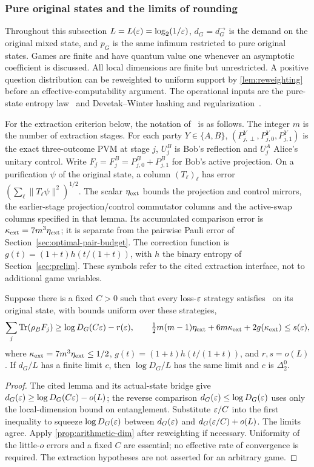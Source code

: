 \subsubsection{Pure original states and the limits of rounding}
Throughout this subsection $L=L(\varepsilon)=\log_2(1/\varepsilon)$, $d_G=d_G^\to$ is the demand on the original mixed state, and $p_G$ is the same infimum restricted to pure original states. Games are finite and have quantum value one whenever an asymptotic coefficient is discussed. All local dimensions are finite but unrestricted. A positive question distribution can be reweighted to uniform support by \cref{lem:reweighting} before an effective-computability argument. The operational inputs are the pure-state entropy law~\cite{BBPS96} and Devetak--Winter hashing and regularization~\cite[Theorems~10 and~13]{DW05}.

For the extraction criterion below, the notation of~\cite[Lemma~12.1]{DM-U3} is as follows. The integer $m$ is the number of extraction stages. For each party $Y\in\{A,B\}$, $(P^Y_{j,\perp},P^Y_{j,0},P^Y_{j,1})$ is the exact three-outcome PVM at stage $j$, $U_j^B$ is Bob's reflection and $U_j^A$ Alice's unitary control. Write $F_j=F_j^B=P^B_{j,0}+P^B_{j,1}$ for Bob's active projection. On a purification $\psi$ of the original state, a column $(T_\ell)_\ell$ has error $(\sum_\ell\|T_\ell\psi\|^2)^{1/2}$. The scalar $\eta_{\rm ext}$ bounds the projection and control mirrors, the earlier-stage projection/control commutator columns and the active-swap columns specified in that lemma. Its accumulated comparison error is $\kappa_{\rm ext}=7m^3\eta_{\rm ext}$; it is separate from the pairwise Pauli error of Section~\ref{sec:optimal-pair-budget}. The correction function is $g(t)=(1+t)h(t/(1+t))$, with $h$ the binary entropy of Section~\ref{sec:prelim}. These symbols refer to the cited extraction interface, not to additional game variables.

\begin{proposition}\label{prop:matched-coefficient}
Suppose there is a fixed $C>0$ such that every loss-$\varepsilon$ strategy satisfies~\cite[Lemma~12.1]{DM-U3} on its original state, with bounds uniform over these strategies,
\[
 \sum_j\operatorname{Tr}(\rho_BF_j)\ge\log D_G(C\varepsilon)-r(\varepsilon),\qquad
 \tfrac12m(m-1)\eta_{\rm ext}+6m\kappa_{\rm ext}+2g(\kappa_{\rm ext})\le s(\varepsilon),
\]
where $\kappa_{\rm ext}=7m^3\eta_{\rm ext}\le1/2$, $g(t)=(1+t)h(t/(1+t))$, and $r,s=o(L)$. If $d_G/L$ has a finite limit $c$, then $\log D_G/L$ has the same limit and $c$ is $\Delta^0_2$.
\end{proposition}
\begin{proof}
The cited lemma and its actual-state bridge give $d_G(\varepsilon)\ge\log D_G(C\varepsilon)-o(L)$; the reverse comparison $d_G(\varepsilon)\le\log D_G(\varepsilon)$ uses only the local-dimension bound on entanglement. Substitute $\varepsilon/C$ into the first inequality to squeeze $\log D_G(\varepsilon)$ between $d_G(\varepsilon)$ and $d_G(\varepsilon/C)+o(L)$. The limits agree. Apply \cref{prop:arithmetic-dim} after reweighting if necessary. Uniformity of the little-$o$ errors and a fixed $C$ are essential; no effective rate of convergence is required. The extraction hypotheses are not asserted for an arbitrary game.
\end{proof}

